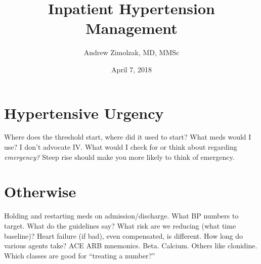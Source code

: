 \documentclass{tufte-handout}
\title{Inpatient Hypertension Management}
\author{Andrew Zimolzak, MD, MMSc}
\date{April 7, 2018}
\begin{document}
\maketitle


\section{Hypertensive Urgency}


Where does the threshold start, where did it used to start?
What meds would I use? I
don't advocate IV. What would I check for or think about regarding
\emph{emergency?} Steep rise should make you more likely to think of
emergency.


\section{Otherwise}

Holding and restarting meds on admission/discharge.
What BP numbers to target. What do the guidelines
say? What risk are we reducing (what time baseline)?
Heart failure (if bad), even compensated, is different.
How long do various agents take? ACE ARB mnemonics. Beta. Calcium.
Others like clonidine. Which classes are good for ``treating a number?''
\end{document}
